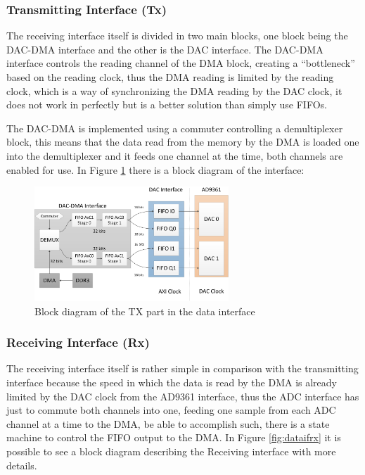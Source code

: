 \subsubsection{Transmitting Interface (Tx)}

The receiving interface itself is divided in two main blocks, one block being the
DAC-DMA interface and the other is the DAC interface. The DAC-DMA interface controls
the reading channel of the DMA block, creating a “bottleneck” based on the reading
clock, thus the DMA reading is limited by the reading clock, which is a way of
synchronizing the DMA reading by the DAC clock, it does not work in perfectly but
is a better solution than simply use FIFOs.

The DAC-DMA is implemented using a commuter controlling a demultiplexer block,
this means that the data read from the memory by the DMA is loaded one into the
demultiplexer and it feeds one channel at the time, both channels are enabled
for use. In Figure \ref{fig:dataiftx} there is a block diagram of the interface:

\begin{figure}[htbp]
    \centering
    \includegraphics[width=0.65\textwidth]{./figures/txdata_if}
    \caption{ Block diagram of the TX part in the data interface
    \label{fig:dataiftx}}
\end{figure}

\subsubsection{Receiving Interface (Rx)}

 The receiving interface itself is rather simple in comparison with the
transmitting interface because the speed in which the data is read by the DMA
is already limited by the DAC clock from the AD9361 interface, thus the ADC
interface has just to commute both channels into one, feeding one sample from
each ADC channel at a time to the DMA, be able to accomplish such, there is a
state machine to control the FIFO output to the DMA. In Figure
\ref{fig:dataifrx} it is possible to see a block diagram describing the
Receiving interface with more details.


